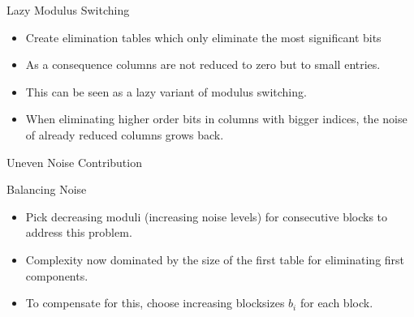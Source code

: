 \documentclass[presentation,smaller]{beamer}
\begin{document}
\begin{frame}[label={sec:orga8fce1d}]{Lazy Modulus Switching}
\begin{itemize}
\item Create elimination tables which only eliminate the most significant bits
\item As a consequence columns are not reduced to zero but to small entries.
\item This can be seen as a lazy variant of modulus switching.

\item<2-> When eliminating higher order bits in columns with bigger indices, the noise of already reduced columns grows back.
\end{itemize}
\end{frame}

\begin{frame}[label={sec:orgff827e4}]{Uneven Noise Contribution}
\begin{center}
\end{center}
\end{frame}

\begin{frame}[label={sec:orgbd9788c}]{Balancing Noise}
\begin{itemize}
\item \alert{Pick decreasing moduli} (increasing noise levels) for consecutive blocks to address this problem.
\item Complexity now dominated by the size of the first table for eliminating first components.
\item To compensate for this, \alert{choose increasing blocksizes} \(b_i\) for each block. 
\end{itemize}
\end{frame}
\end{document}
